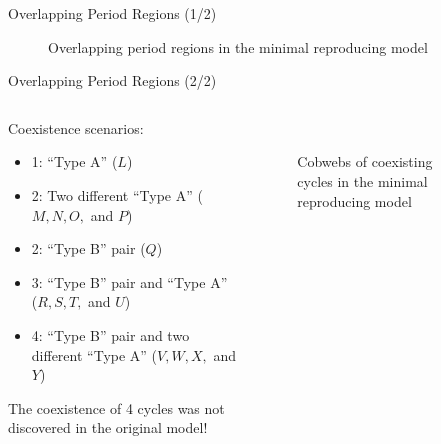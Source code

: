 \begin{frame}{Overlapping Period Regions (1/2)}
    \vspace{-1.0em}
    \begin{figure}
        \centering
        \caption{Overlapping period regions in the minimal reproducing model}
    \end{figure}
\end{frame}

\begin{frame}{Overlapping Period Regions (2/2)}
    \begin{columns}
        \begin{column}{.6 \textwidth}
            Coexistence scenarios:
            \begin{itemize}
                \item 1: ``Type A'' ($L$)
                \item 2: Two different ``Type A'' ($M, N, O,$ and $P$)
                \item 2: ``Type B'' pair ($Q$)
                \item 3: ``Type B'' pair and ``Type A'' ($R, S, T,$ and $U$)
                \item 4: ``Type B'' pair and two different ``Type A'' ($V, W, X,$ and $Y$)
            \end{itemize}

            \vspace{2em}
            The coexistence of 4 cycles was not discovered in the original model!
        \end{column}
        \begin{column}{.4 \textwidth}
            \vspace{-4.0em}
            \begin{figure}
                \centering
                \quad
                \\
                \quad
                \caption{Cobwebs of coexisting cycles in the minimal reproducing model}
            \end{figure}
        \end{column}
    \end{columns}
\end{frame}

